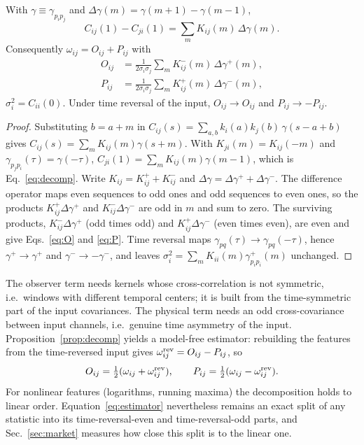 \begin{proposition}\label{prop:decomp}
With $\gamma\equiv\gamma_{p_ip_j}$ and $\Delta\gamma(m)=\gamma(m+1)-\gamma(m-1)$,
\begin{equation}
C_{ij}(1)-C_{ji}(1)=\sum_m K_{ij}(m)\,\Delta\gamma(m).\label{eq:decomp}
\end{equation}
Consequently $\omega_{ij}=O_{ij}+P_{ij}$ with
\begin{align}
O_{ij}&=\frac{1}{2\sigma_i\sigma_j}\sum_m K^-_{ij}(m)\,\Delta\gamma^+(m),\label{eq:O}\\
P_{ij}&=\frac{1}{2\sigma_i\sigma_j}\sum_m K^+_{ij}(m)\,\Delta\gamma^-(m),\label{eq:P}
\end{align}
$\sigma_i^2=C_{ii}(0)$. Under time reversal of the input, $O_{ij}\to O_{ij}$ and $P_{ij}\to-P_{ij}$.
\end{proposition}

\begin{proof}
Substituting $b=a+m$ in $C_{ij}(s)=\sum_{a,b}k_i(a)k_j(b)\,\gamma(s-a+b)$ gives $C_{ij}(s)=\sum_mK_{ij}(m)\gamma(s+m)$. With $K_{ji}(m)=K_{ij}(-m)$ and $\gamma_{p_jp_i}(\tau)=\gamma(-\tau)$, $C_{ji}(1)=\sum_mK_{ij}(m)\gamma(m-1)$, which is Eq.~\eqref{eq:decomp}. Write $K_{ij}=K^+_{ij}+K^-_{ij}$ and $\Delta\gamma=\Delta\gamma^++\Delta\gamma^-$. The difference operator maps even sequences to odd ones and odd sequences to even ones, so the products $K^+_{ij}\Delta\gamma^+$ and $K^-_{ij}\Delta\gamma^-$ are odd in $m$ and sum to zero. The surviving products, $K^-_{ij}\Delta\gamma^+$ (odd times odd) and $K^+_{ij}\Delta\gamma^-$ (even times even), are even and give Eqs.~\eqref{eq:O} and \eqref{eq:P}. Time reversal maps $\gamma_{pq}(\tau)\to\gamma_{pq}(-\tau)$, hence $\gamma^+\to\gamma^+$ and $\gamma^-\to-\gamma^-$, and leaves $\sigma_i^2=\sum_mK_{ii}(m)\gamma^+_{p_ip_i}(m)$ unchanged.
\end{proof}

The observer term needs kernels whose cross-correlation is not symmetric, i.e.\ windows with different temporal centers; it is built from the time-symmetric part of the input covariances. The physical term needs an odd cross-covariance between input channels, i.e.\ genuine time asymmetry of the input. Proposition~\ref{prop:decomp} yields a model-free estimator: rebuilding the features from the time-reversed input gives $\omega^{\rm rev}_{ij}=O_{ij}-P_{ij}$, so
\begin{equation}
O_{ij}=\tfrac12(\omega_{ij}+\omega^{\rm rev}_{ij}),\qquad P_{ij}=\tfrac12(\omega_{ij}-\omega^{\rm rev}_{ij}).\label{eq:estimator}
\end{equation}
For nonlinear features (logarithms, running maxima) the decomposition holds to linear order. Equation~\eqref{eq:estimator} nevertheless remains an exact split of any statistic into its time-reversal-even and time-reversal-odd parts, and Sec.~\ref{sec:market} measures how close this split is to the linear one.

